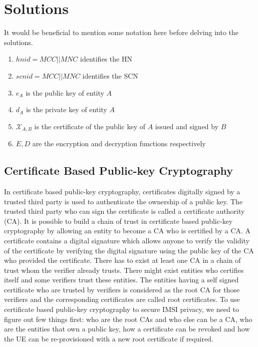 \documentclass[lnicst,sechang,a4paper]{svmultln}
\begin{document}
\section{Solutions}\label{sec:solutions} 
\label{sec:solutions}
It would be beneficial to mention some notation here before delving into the solutions. 
\begin{enumerate}
\item $hnid=MCC||MNC$ identifies the HN
\item $scnid=MCC||MNC$ identifies the SCN
\item $e_A$ is the public key of entity $A$
\item $d_A$ is the private key of entity $A$ 
\item $\mathcal{X}_{A,B}$ is the certificate of the public key of $A$ issued and signed by $B$
\item $E,D$ are the encryption and decryption functions respectively
\end{enumerate}


\subsection{Certificate Based Public-key Cryptography} 
\label{sub_sec:solution_certificate}
In certificate based public-key cryptography, certificates digitally signed by a trusted third party is used to authenticate the ownership of a public key. The trusted third party who can sign the certificate is called a certificate authority (CA). It is possible to build a chain of trust in certificate based public-key cryptography by allowing an entity to become a CA who is certified by a CA. A certificate contains a digital signature which allows anyone to verify the validity of the certificate by verifying the digital signature using the public key of the CA who provided the certificate. There has to exist at least one CA in a chain of trust whom the verifier already trusts. There might exist entities who certifies itself and some verifiers trust these entities. The entities having a self signed certificate who are trusted by verifiers is considered as the root CA for those verifiers and the corresponding certificates are called root certificates. To use certificate based public-key cryptography to secure IMSI privacy, we need to figure out few things first: who are the root CAs and who else can be a CA, who are the entities that own a public key, how a certificate can be revoked and how the UE can be re-provisioned with a new root certificate if required.
\end{document}
